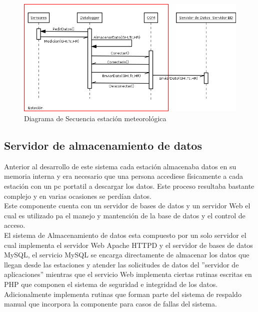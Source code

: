 \begin{figure}[h!]
        \centering
        \includegraphics[scale=0.4]{images/estacionSecuencia}
        \caption{Diagrama de Secuencia estación meteorológica}
        \label{despliegue}
\end{figure}

\subsection{Servidor de almacenamiento de datos}
Anterior al desarrollo de este sistema cada estación almacenaba datos en su memoria interna y era necesario que una persona accediese físicamente a cada estación con un pc portatil a descargar los datos. Este proceso resultaba bastante complejo y en varias ocasiones se perdían datos.\\ Este componente cuenta con un servidor de bases de datos y un servidor Web el cual es utilizado pa el manejo y mantención de la base de datos y el control de acceso.\\

El sistema de Almacenamiento de datos esta compuesto por un solo servidor el cual implementa el servidor Web Apache HTTPD y el servidor de bases de datos MySQL, el servicio MySQL se encarga directamente de almacenar los datos que llegan desde las estaciones y atender las solicitudes de datos del ''servidor de aplicaciones'' mientras que el servicio Web implementa ciertas rutinas escritas en PHP que componen el sistema de seguridad e integridad de los datos. Adicionalmente implementa rutinas que forman parte del sistema de respaldo manual que incorpora la componente para casos de fallas del sistema.\\

